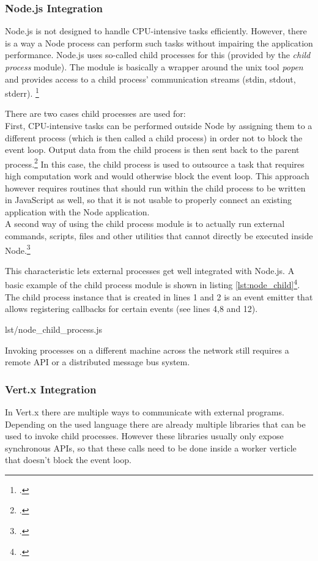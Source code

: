 \subsubsection{Node.js Integration}
\label{node_integration}
Node.js is not designed to handle CPU-intensive tasks efficiently. However,
there is a way a Node process can perform such tasks without impairing the
application performance. Node.js uses so-called child processes for this
(provided by the \textit{child process}
module). The module is basically a wrapper around the unix tool \textit{popen} and
provides access to a child process' communication streams (stdin, stdout, stderr).
\footcite[Cf.][]{node_child_process}

There are two cases child processes are used for:\\
First, CPU-intensive tasks can be performed outside Node by assigning them to a
different process (which is then called a child process) in order not to block
the event loop. Output data from the child process is then sent back to the
parent process.\footcite[Cf.][63]{teixeira_2012} In this case, the child process is used to
outsource a task that requires high computation work and would otherwise block
the event loop. This approach however requires routines that should run
within the child process to be written in JavaScript as well, so that it is not
usable to properly connect an existing application with the Node application.\\
A second way of using the child process module is to actually run external
commands, scripts, files and other utilities that cannot directly be executed inside Node.\footcite[Cf.][63]{teixeira_2012}

This characteristic lets external processes get well integrated with Node.js.
A basic example of the child process module is shown in listing \ref{lst:node_child}\footcite[Taken from][]{node_child_process}.
The child process instance that is created in lines 1 and 2 is an event emitter that
allows registering callbacks for certain events (see lines 4,8 and 12).

%
{lst/node_child_process.js}


Invoking processes on a different machine across the network still
requires a remote API or a distributed message bus system.


\subsubsection{Vert.x Integration}
\label{vertx_integration}
In Vert.x there are multiple ways to communicate with external programs.
Depending on the used language there are already multiple libraries that can be
used to invoke child processes. However these libraries usually only expose
synchronous APIs, so that these calls need to be done inside a worker verticle
that doesn't block the event loop.\\

